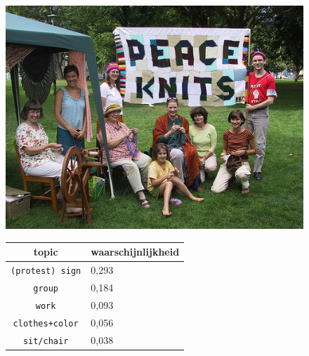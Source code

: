 \begin{figure}[h]
    \centering
    \begin{minipage}[t]{.5\linewidth}
    \centering
    \vspace{0pt}
    \includegraphics[width=\textwidth]{Images/LDA/4386588.jpg}
    \end{minipage}\hfill
    \begin{minipage}[t]{.5\textwidth}
    \centering
    \vspace{0pt}
    \begin{tabularx}{\textwidth}{cl}
            topic                           & waarschijnlijkheid\\
            \hline
            \texttt{(protest) sign} & 0,293\\
            \texttt{group} & 0,184\\
            \texttt{work} & 0,093\\
            \texttt{clothes+color} & 0,056\\
            \texttt{sit/chair} & 0,038\\
            \hline
        \end{tabularx}
    \end{minipage}
\end{figure}

